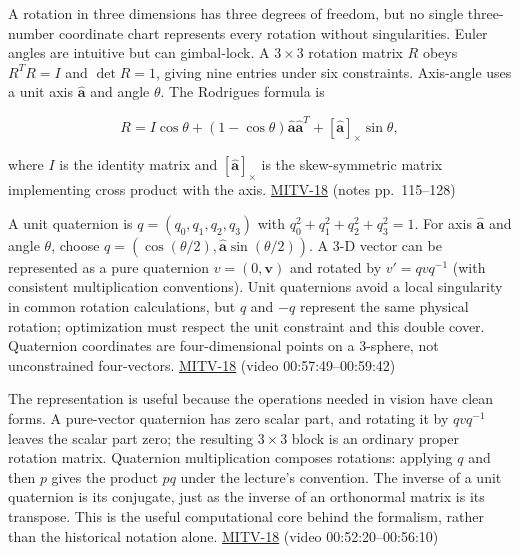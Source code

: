 \hypertarget{04-visual-computing-ii-ch032-rotations-and-the-geometry-of-their-parameter-space}{}

A rotation in three dimensions has three degrees of freedom, but no single three-number coordinate chart represents every rotation without singularities. Euler angles are intuitive but can gimbal-lock. A \(3\times3\) rotation matrix \(R\) obeys \(R^TR=I\) and \(\det R=1\), giving nine entries under six constraints. Axis-angle uses a unit axis \(\hat{\mathbf{a}}\) and angle \(\theta\). The Rodrigues formula is

\[
R=I\cos\theta +(1-\cos\theta)\hat{\mathbf{a}}\hat{\mathbf{a}}^T+[\hat{\mathbf{a}}]_\times\sin\theta,
\]

where \(I\) is the identity matrix and \([\hat{\mathbf{a}}]_\times\) is the skew-symmetric matrix implementing cross product with the axis. \hyperref[04-visual-computing-ii-ch036-mitv-18---rotation-and-how-to-represent-it-unit-quaternions-the-space-of-rotations]{MITV-18} (notes pp.~115--128)

A unit quaternion is \(q=(q_0,q_1,q_2,q_3)\) with \(q_0^2+q_1^2+q_2^2+q_3^2=1\). For axis \(\hat{\mathbf{a}}\) and angle \(\theta\), choose \(q=(\cos(\theta/2),\hat{\mathbf{a}}\sin(\theta/2))\). A 3-D vector can be represented as a pure quaternion \(v=(0,\mathbf{v})\) and rotated by \(v'=qv q^{-1}\) (with consistent multiplication conventions). Unit quaternions avoid a local singularity in common rotation calculations, but \(q\) and \(-q\) represent the same physical rotation; optimization must respect the unit constraint and this double cover. Quaternion coordinates are four-dimensional points on a 3-sphere, not unconstrained four-vectors. \hyperref[04-visual-computing-ii-ch036-mitv-18---rotation-and-how-to-represent-it-unit-quaternions-the-space-of-rotations]{MITV-18} (video 00:57:49--00:59:42)

The representation is useful because the operations needed in vision have clean forms. A pure-vector quaternion has zero scalar part, and rotating it by \(qvq^{-1}\) leaves the scalar part zero; the resulting \(3\times3\) block is an ordinary proper rotation matrix. Quaternion multiplication composes rotations: applying \(q\) and then \(p\) gives the product \(pq\) under the lecture's convention. The inverse of a unit quaternion is its conjugate, just as the inverse of an orthonormal matrix is its transpose. This is the useful computational core behind the formalism, rather than the historical notation alone. \hyperref[04-visual-computing-ii-ch036-mitv-18---rotation-and-how-to-represent-it-unit-quaternions-the-space-of-rotations]{MITV-18} (video 00:52:20--00:56:10)

